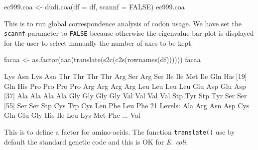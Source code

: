 \documentclass{article}
\begin{document}
\begin{Schunk}
\begin{Sinput}
 ec999.coa <- dudi.coa(df = df, scannf = FALSE)
 ec999.coa
\end{Sinput}
\end{Schunk}

This is to run global correspondence analysis of codon usage.
We have set the \texttt{scannf} parameter to \texttt{FALSE}
because otherwise the eigenvalue bar plot is displayed for the
user to select manually the number of axes to be kept.


\begin{Schunk}
\begin{Sinput}
 facaa <- as.factor(aaa(translate(s2c(c2s(rownames(df))))))
 facaa
\end{Sinput}
\begin{Soutput}
 [1] Lys Asn Lys Asn Thr Thr Thr Thr Arg Ser Arg Ser Ile Ile Met Ile Gln His
[19] Gln His Pro Pro Pro Pro Arg Arg Arg Arg Leu Leu Leu Leu Glu Asp Glu Asp
[37] Ala Ala Ala Ala Gly Gly Gly Gly Val Val Val Val Stp Tyr Stp Tyr Ser Ser
[55] Ser Ser Stp Cys Trp Cys Leu Phe Leu Phe
21 Levels: Ala Arg Asn Asp Cys Gln Glu Gly His Ile Leu Lys Met Phe ... Val
\end{Soutput}
\end{Schunk}

This is to define a factor for amino-acids. The function \texttt{translate()} use by
default the standard genetic code and this is OK for \textit{E. coli}.
\end{document}
